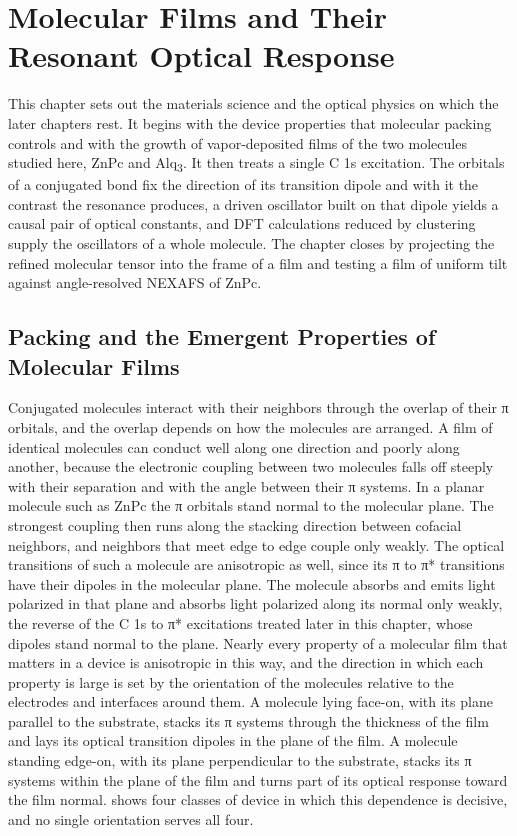 \chapter{Molecular Films and Their Resonant Optical Response}\label{chap:molecular-films}

This chapter sets out the materials science and the optical physics on which the later chapters rest. It begins with the device properties that molecular packing controls and with the growth of vapor-deposited films of the two molecules studied here, ZnPc and Alq\textsubscript{3}. It then treats a single C 1s excitation. The orbitals of a conjugated bond fix the direction of its transition dipole and with it the contrast the resonance produces, a driven oscillator built on that dipole yields a causal pair of optical constants, and DFT calculations reduced by clustering supply the oscillators of a whole molecule. The chapter closes by projecting the refined molecular tensor into the frame of a film and testing a film of uniform tilt against angle-resolved NEXAFS of ZnPc.

\section{Packing and the Emergent Properties of Molecular Films}\label{sec:packing-and-the-emergent-properties-of-molecular-films}

Conjugated molecules interact with their neighbors through the overlap of their π orbitals, and the overlap depends on how the molecules are arranged. A film of identical molecules can conduct well along one direction and poorly along another, because the electronic coupling between two molecules falls off steeply with their separation and with the angle between their π systems.\autocite{bredasChargeTransferEnergyTransferProcesses2004} In a planar molecule such as ZnPc the π orbitals stand normal to the molecular plane. The strongest coupling then runs along the stacking direction between cofacial neighbors, and neighbors that meet edge to edge couple only weakly. The optical transitions of such a molecule are anisotropic as well, since its π to π* transitions have their dipoles in the molecular plane. The molecule absorbs and emits light polarized in that plane and absorbs light polarized along its normal only weakly, the reverse of the C 1s to π* excitations treated later in this chapter, whose dipoles stand normal to the plane. Nearly every property of a molecular film that matters in a device is anisotropic in this way, and the direction in which each property is large is set by the orientation of the molecules relative to the electrodes and interfaces around them. A molecule lying face-on, with its plane parallel to the substrate, stacks its π systems through the thickness of the film and lays its optical transition dipoles in the plane of the film. A molecule standing edge-on, with its plane perpendicular to the substrate, stacks its π systems within the plane of the film and turns part of its optical response toward the film normal.  shows four classes of device in which this dependence is decisive, and no single orientation serves all four.


